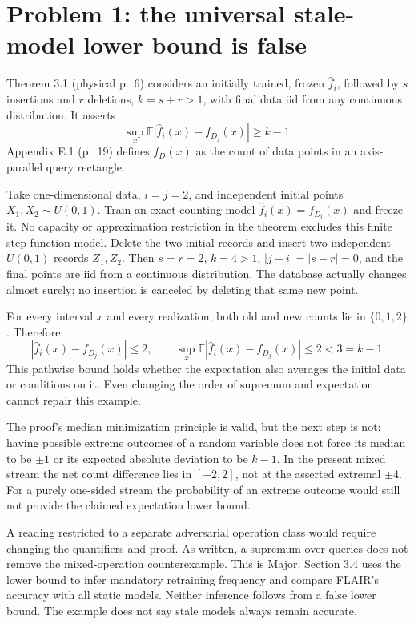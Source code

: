 \documentclass[10pt]{article}
\begin{document}
\section*{Problem 1: the universal stale-model lower bound is false}
Theorem 3.1 (physical p. 6) considers an initially trained, frozen \(\widehat f_i\), followed by \(s\) insertions and \(r\) deletions, \(k=s+r>1\), with final data iid from any continuous distribution. It asserts \[\sup_x\mathbb E|\widehat f_i(x)-f_{D_j}(x)|\ge k-1.\] Appendix E.1 (p. 19) defines \(f_D(x)\) as the count of data points in an axis-parallel query rectangle.\par
Take one-dimensional data, \(i=j=2\), and independent initial points \(X_1,X_2\sim U(0,1)\). Train an exact counting model \(\widehat f_i(x)=f_{D_i}(x)\) and freeze it. No capacity or approximation restriction in the theorem excludes this finite step-function model. Delete the two initial records and insert two independent \(U(0,1)\) records \(Z_1,Z_2\). Then \(s=r=2\), \(k=4>1\), \(|j-i|=|s-r|=0\), and the final points are iid from a continuous distribution. The database actually changes almost surely; no insertion is canceled by deleting that same new point.\par
For every interval \(x\) and every realization, both old and new counts lie in \(\{0,1,2\}\). Therefore \[|\widehat f_i(x)-f_{D_j}(x)|\le2,\qquad
 \sup_x\mathbb E|\widehat f_i(x)-f_{D_j}(x)|\le2<3=k-1.\] This pathwise bound holds whether the expectation also averages the initial data or conditions on it. Even changing the order of supremum and expectation cannot repair this example.\par
The proof’s median minimization principle is valid, but the next step is not: having possible extreme outcomes of a random variable does not force its median to be \(\pm1\) or its expected absolute deviation to be \(k-1\). In the present mixed stream the net count difference lies in \([-2,2]\), not at the asserted extremal \(\pm4\). For a purely one-sided stream the probability of an extreme outcome would still not provide the claimed expectation lower bound.\par
A reading restricted to a separate adversarial operation class would require changing the quantifiers and proof. As written, a supremum over queries does not remove the mixed-operation counterexample. This is Major: Section 3.4 uses the lower bound to infer mandatory retraining frequency and compare FLAIR’s accuracy with all static models. Neither inference follows from a false lower bound. The example does not say stale models always remain accurate.\par
\end{document}

